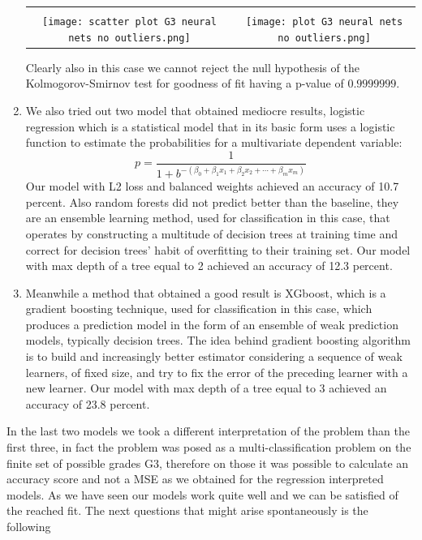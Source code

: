 \documentclass[a4paper, 11pt]{report}
\theoremstyle{definition}
\numberwithin{equation}{section}		%
\numberwithin{figure}{section}			%
\numberwithin{table}{section}				%
\begin{document}
\begin{enumerate}
\begin{frame}
      \vspace{0.05em}
        \begin{tabular}{cc}
          &  \\
        \texttt{[image: scatter plot G3 neural nets no outliers.png]}
         &
         \texttt{[image: plot G3 neural nets no outliers.png]}
         \end{tabular}
    \end{frame}
\newline
Clearly also in this case we cannot reject the null hypothesis of the Kolmogorov-Smirnov test for goodness of fit having a p-value of $0.9999999$.
\item We also tried out two model that obtained mediocre results, logistic regression which is a statistical model that in its basic form uses a logistic function to estimate the probabilities for a multivariate dependent variable: $$p=\frac{1}{1+b^{-\left(\beta_{0}+\beta_{1} x_{1}+\beta_{2} x_{2}+\cdots+\beta_{m} x_{m}\right)}}$$
Our model with L2 loss and balanced weights achieved an accuracy of 10.7 percent. Also random forests did not predict better than the baseline, they are an ensemble learning method, used for classification in this case, that operates by constructing a multitude of decision trees at training time and correct for decision trees' habit of overfitting to their training set. Our model with max depth of a tree equal to 2 achieved an accuracy of 12.3 percent.
\item Meanwhile a method that obtained a good result is XGboost, which is a gradient boosting technique, used for classification in this case, which produces a prediction model in the form of an ensemble of weak prediction models, typically decision trees. The idea behind gradient boosting algorithm is to build and increasingly better estimator considering a sequence of weak learners, of fixed size, and try to fix the error of the preceding learner with a new learner. Our model with max depth of a tree equal to 3 achieved an accuracy of 23.8 percent.
\end{enumerate}
In the last two models we took a different interpretation of the problem than the first three, in fact the problem was posed as a multi-classification problem on the finite set of possible grades G3, therefore on those it was possible to calculate an accuracy score and not a MSE as we obtained for the regression interpreted models.
As we have seen our models work quite well and we can be satisfied of the reached fit. The next questions that might arise spontaneously is the following
\end{document}
